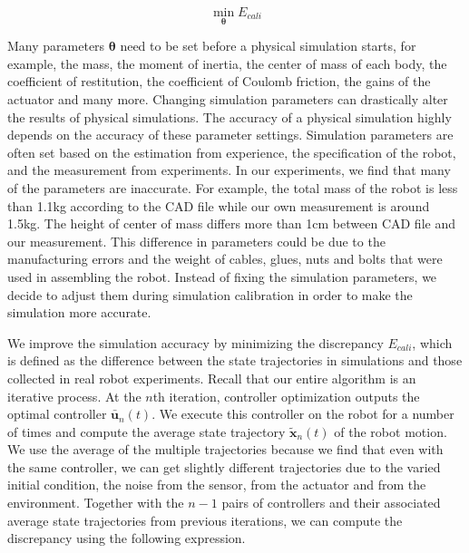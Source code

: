 \begin{equation}
 \min_{\mathbf{\theta}} E_{cali}
\label{eqn:calibration}
\end{equation}

Many parameters $\mathbf{\theta}$ need to be set before a physical simulation starts, for example, the mass, the moment of inertia, the center of mass of each body, the coefficient of restitution, the coefficient of Coulomb friction, the gains of the actuator and many more. Changing simulation parameters can drastically alter the results of physical simulations. The accuracy of a physical simulation highly depends on the accuracy of these parameter settings. Simulation parameters are often set based on the estimation from experience, the specification of the robot, and the measurement from experiments. In our experiments, we find that many of the parameters are inaccurate. For example, the total mass of the robot is less than 1.1kg according to the CAD file while our own measurement is around 1.5kg. The height of center of mass differs more than 1cm between CAD file and our measurement. This difference in parameters could be due to the manufacturing errors and the weight of cables, glues, nuts and bolts that were used in assembling the robot. Instead of fixing the simulation parameters, we decide to adjust them during simulation calibration in order to make the simulation more accurate.

We improve the simulation accuracy by minimizing the discrepancy $E_{cali}$, which is defined as the difference between the state trajectories in simulations and those collected in real robot experiments. Recall that our entire algorithm is an iterative process. At the $n$th iteration, controller optimization outputs the optimal controller $\bar{\mathbf{u}}_n(t)$. We execute this controller on the robot for a number of times and compute the average state trajectory $\tilde{\mathbf{x}}_n(t)$ of the robot motion. We use the average of the multiple trajectories because we find that even with the same controller, we can get slightly different trajectories due to the varied initial condition, the noise from the sensor, from the actuator and from the environment. Together with the $n-1$ pairs of controllers and their associated average state trajectories from previous iterations, we can compute the discrepancy using the following expression. 

